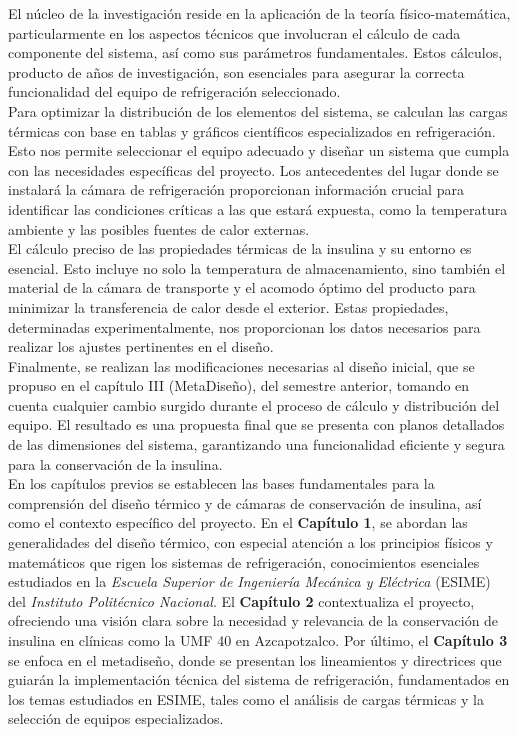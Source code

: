  El núcleo de la investigación reside en la aplicación de la teoría físico-matemática, particularmente en los aspectos técnicos que involucran el cálculo de cada componente del sistema, así como sus parámetros fundamentales. Estos cálculos, producto de años de investigación, son esenciales para asegurar la correcta funcionalidad del equipo de refrigeración seleccionado.\\
 Para optimizar la distribución de los elementos del sistema, se calculan las cargas térmicas con base en tablas y gráficos científicos especializados en refrigeración. Esto nos permite seleccionar el equipo adecuado y diseñar un sistema que cumpla con las necesidades específicas del proyecto. Los antecedentes del lugar donde se instalará la cámara de refrigeración proporcionan información crucial para identificar las condiciones críticas a las que estará expuesta, como la temperatura ambiente y las posibles fuentes de calor externas.\\
 El cálculo preciso de las propiedades térmicas de la insulina y su entorno es esencial. Esto incluye no solo la temperatura de almacenamiento, sino también el material de la cámara de transporte y el acomodo óptimo del producto para minimizar la transferencia de calor desde el exterior. Estas propiedades, determinadas experimentalmente, nos proporcionan los datos necesarios para realizar los ajustes pertinentes en el diseño.\\
 Finalmente, se realizan las modificaciones necesarias al diseño inicial, que se propuso en el capítulo III (MetaDiseño), del semestre anterior, tomando en cuenta cualquier cambio surgido durante el proceso de cálculo y distribución del equipo. El resultado es una propuesta final que se presenta con planos detallados de las dimensiones del sistema, garantizando una funcionalidad eficiente y segura para la conservación de la insulina.\\
En los capítulos previos se establecen las bases fundamentales   para la comprensión del diseño térmico y de cámaras de conservación de insulina, así como el contexto específico del proyecto. En el \textbf{Capítulo 1}, se abordan las generalidades del diseño térmico, con especial atención a los principios físicos y matemáticos que rigen los sistemas de refrigeración, conocimientos esenciales estudiados en la \textit{Escuela Superior de Ingeniería Mecánica y Eléctrica} (ESIME) del \textit{Instituto Politécnico Nacional}. El \textbf{Capítulo 2} contextualiza el proyecto, ofreciendo una visión clara sobre la necesidad y relevancia de la conservación de insulina en clínicas como la UMF 40 en Azcapotzalco. Por último, el \textbf{Capítulo 3} se enfoca en el metadiseño, donde se presentan los lineamientos y directrices que guiarán la implementación técnica del sistema de refrigeración, fundamentados en los temas estudiados en ESIME, tales como el análisis de cargas térmicas y la selección de equipos especializados.
 \newpage
